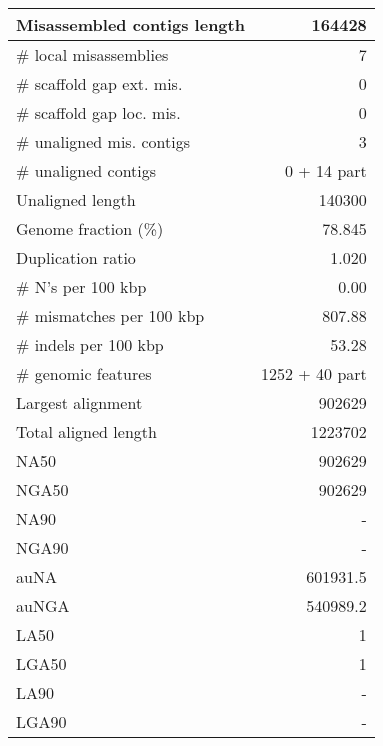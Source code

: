 \documentclass[12pt,a4paper]{article}
\begin{document}
\begin{table}[ht]
\begin{center}
\begin{tabular}{|l*{1}{|r}|}
Misassembled contigs length & 164428 \\ \hline
\# local misassemblies & 7 \\ \hline
\# scaffold gap ext. mis. & 0 \\ \hline
\# scaffold gap loc. mis. & 0 \\ \hline
\# unaligned mis. contigs & 3 \\ \hline
\# unaligned contigs & 0 + 14 part \\ \hline
Unaligned length & 140300 \\ \hline
Genome fraction (\%) & 78.845 \\ \hline
Duplication ratio & 1.020 \\ \hline
\# N's per 100 kbp & 0.00 \\ \hline
\# mismatches per 100 kbp & 807.88 \\ \hline
\# indels per 100 kbp & 53.28 \\ \hline
\# genomic features & 1252 + 40 part \\ \hline
Largest alignment & 902629 \\ \hline
Total aligned length & 1223702 \\ \hline
NA50 & 902629 \\ \hline
NGA50 & 902629 \\ \hline
NA90 & - \\ \hline
NGA90 & - \\ \hline
auNA & 601931.5 \\ \hline
auNGA & 540989.2 \\ \hline
LA50 & 1 \\ \hline
LGA50 & 1 \\ \hline
LA90 & - \\ \hline
LGA90 & - \\ \hline
\end{tabular}
\end{center}
\end{table}
\end{document}
